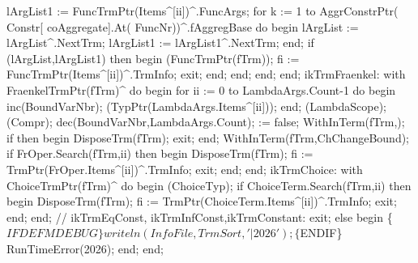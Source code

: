                        lArgList1 := FuncTrmPtr(Items^[ii])^.FuncArgs;
                       for k := 1 to AggrConstrPtr( Constr[ coAggregate].At( FuncNr))^.fAggregBase do
                       begin
                          lArgList := lArgList^.NextTrm;
                          lArgList1 := lArgList1^.NextTrm;
                       end;
                       if (lArgList,lArgList1) then
                       begin
                          (FuncTrmPtr(fTrm));
                          fi := FuncTrmPtr(Items^[ii])^.TrmInfo;
                          exit;
                       end;
                    end;
              end;
           end;
        ikTrmFraenkel:
           with FraenkelTrmPtr(fTrm)^ do
           begin
              for ii := 0 to LambdaArgs.Count-1 do
              begin
                 inc(BoundVarNbr);
                 (TypPtr(LambdaArgs.Items^[ii]));
              end;
              (LambdaScope);
              (Compr);
              dec(BoundVarNbr,LambdaArgs.Count);
               := false;
              WithInTerm(fTrm,);
              if  then
              begin
                 DisposeTrm(fTrm);
                 exit;
              end;
              WithInTerm(fTrm,ChChangeBound);
              if FrOper.Search(fTrm,ii) then
              begin
                 DisposeTrm(fTrm);
                 fi := TrmPtr(FrOper.Items^[ii])^.TrmInfo;
                 exit;
              end;
           end;
        ikTrmChoice:
           with ChoiceTrmPtr(fTrm)^ do
           begin
              (ChoiceTyp);
              if ChoiceTerm.Search(fTrm,ii) then
              begin
                 DisposeTrm(fTrm);
                 fi := TrmPtr(ChoiceTerm.Items^[ii])^.TrmInfo;
                 exit;
              end;
           end;
        //    ikTrmEqConst,
        ikTrmInfConst,ikTrmConstant:
        exit;
      else
      begin
         \{$IFDEF MDEBUG\}
         writeln(InfoFile,TrmSort,'|2026');
         \{$ENDIF\}
         RunTimeError(2026);
      end;
   end;
   
